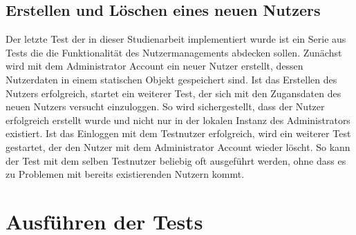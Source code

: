 \subsection{Erstellen und Löschen eines neuen Nutzers}

Der letzte Test der in dieser Studienarbeit implementiert wurde ist ein Serie aus Tests die die Funktionalität des Nutzermanagements abdecken sollen.
Zunächst wird mit dem Administrator Account ein neuer Nutzer erstellt, dessen Nutzerdaten in einem statischen Objekt gespeichert sind.
Ist das Erstellen des Nutzers erfolgreich, startet ein weiterer Test, der sich mit den Zugansdaten des neuen Nutzers versucht einzuloggen.
So wird sichergestellt, dass der Nutzer erfolgreich erstellt wurde und nicht nur in der lokalen Instanz des Administrators existiert.
Ist das Einloggen mit dem Testnutzer erfolgreich, wird ein weiterer Test gestartet, der den Nutzer mit dem Administrator Account wieder löscht.
So kann der Test mit dem selben Testnutzer beliebig oft ausgeführt werden, ohne dass es zu Problemen mit bereits existierenden Nutzern kommt.

\section{Ausführen der Tests}

